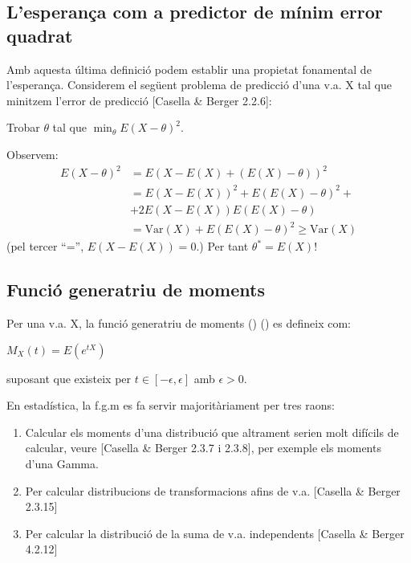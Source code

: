 \documentclass[letterpaper,10pt,english]{sphinxmanual}
\begin{document}
\subsection{L’esperança com a predictor de mínim error quadrat}
\label{\detokenize{0_Intro/0_1_Repas_probabilitat:l-esperanca-com-a-predictor-de-minim-error-quadrat}}
Amb aquesta última definició podem establir una propietat
fonamental de l’esperança. Considerem el següent problema de predicció
d’una v.a. X tal que minitzem l’error de predicció {[}Casella \& Berger 2.2.6{]}:

Trobar \(\theta\) tal que \(\min_{\theta} E\left(X - \theta \right)^2\).

Observem:
\begin{equation*}
\begin{split}E\left(X - \theta \right)^2 &= E\left(X - E(X) + \left(E(X) - \theta\right)\right)^2 \\
                            &= E\left(X - E(X)\right)^2 + E\left(E(X) - \theta\right)^2 + \\
                            & + 2E\left(X - E(X)\right)E\left(E(X) - \theta\right) \\
                            &= \mbox{Var}\left(X\right) + E\left(E(X) - \theta\right)^2 \geq \mbox{Var}\left(X\right)\end{split}
\end{equation*}
(pel tercer “=”, \(E\left(X - E(X)\right)=0\).) Per tant \(\theta^*=E(X)\)!


\subsection{Funció generatriu de moments}
\label{\detokenize{0_Intro/0_1_Repas_probabilitat:funcio-generatriu-de-moments}}
Per una v.a. X, la funció generatriu de moments () () es defineix com:

\(M_X\left(t\right)=E\left(e^{tX}\right)\)

suposant que existeix per \(t\in [-\epsilon, \epsilon]\) amb \(\epsilon>0\).

En estadística, la f.g.m es fa servir majoritàriament per tres raons:
\begin{enumerate}
%
\item {} 
Calcular els moments d’una distribució que altrament serien molt difícils de calcular, veure {[}Casella \& Berger 2.3.7 i 2.3.8{]}, per exemple els moments d’una Gamma.

\item {} 
Per calcular distribucions de transformacions afins de v.a. {[}Casella \& Berger 2.3.15{]}

\item {} 
Per calcular la distribució de la suma de v.a. independents {[}Casella \& Berger 4.2.12{]}

\end{enumerate}
\end{document}
